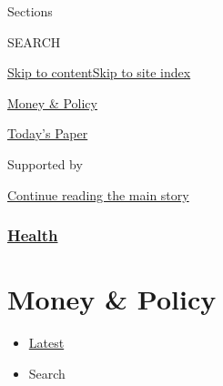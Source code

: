 Sections

SEARCH

\protect\hyperlink{site-content}{Skip to
content}\protect\hyperlink{site-index}{Skip to site index}

\href{https://www.nytimes.com/section/health/policy}{Money \& Policy}

\href{https://myaccount.nytimes.com/auth/login?response_type=cookie\&client_id=vi}{}

\href{https://www.nytimes.com/section/todayspaper}{Today's Paper}

Supported by

\protect\hyperlink{after-sponsor}{Continue reading the main story}

\hypertarget{health}{%
\subsubsection{\texorpdfstring{\href{/section/health}{Health}}{Health}}\label{health}}

\hypertarget{money--policy}{%
\section{Money \& Policy}\label{money--policy}}

\begin{itemize}
\tightlist
\item
  \protect\hyperlink{stream-panel}{Latest}
\item
  Search
\end{itemize}


